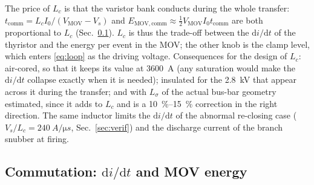 \documentclass[11pt,a4paper]{article}
\begin{document}
The price of $L_c$ is that the varistor bank conducts during the whole transfer:
$t_{\mathrm{comm}} = L_c I_0/(V_{\mathrm{MOV}} - V_s)$ and $E_{\mathrm{MOV,comm}} \approx
\tfrac12 V_{\mathrm{MOV}} I_0 t_{\mathrm{comm}}$ are both proportional to $L_c$
(Sec.~\ref{sec:didt}). $L_c$ is thus the trade-off between the $\mathrm{d}i/\mathrm{d}t$ of the
thyristor and the energy per event in the MOV; the other knob is the clamp level, which enters
\eqref{eq:loop} as the driving voltage. Consequences for the design of $L_c$: air-cored, so that
it keeps its value at \SI{3600}{A} (any saturation would make the $\mathrm{d}i/\mathrm{d}t$
collapse exactly when it is needed); insulated for the \SI{2.8}{kV} that appear across it
during the transfer; and with $L_\sigma$ of the actual bus-bar geometry estimated, since it adds
to $L_c$ and is a \SIrange{10}{15}{\percent} correction in the right direction. The same
inductor limits the $\mathrm{d}i/\mathrm{d}t$ of the abnormal re-closing case
($V_s/L_c = \SI{240}{A/\micro s}$, Sec.~\ref{sec:verif}) and the discharge current of the
branch snubber at firing.

\subsection{Commutation: $\mathrm{d}i/\mathrm{d}t$ and MOV energy}
\label{sec:didt}
\end{document}
